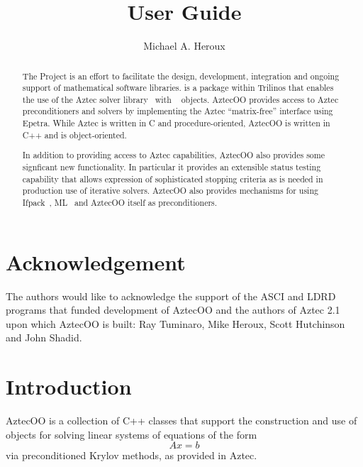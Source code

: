 \documentclass[12pt,relax]{AztecOOUserGuide}
\title{\AztecOOTM{} User Guide}
\author{Michael A. Heroux}
\date{} %
\begin{document}
\maketitle

\begin{abstract}

The \TrilinosTM{} Project is an effort to facilitate the design, development,
integration and ongoing support of mathematical software libraries.
\AztecOOTM{} is a package within Trilinos that enables the use of the Aztec solver 
library~\cite{Aztec2.1} with \EpetraTM{}~\cite{Epetra-home-page} objects.  
AztecOO provides access to Aztec preconditioners and solvers by
implementing the Aztec ``matrix-free'' interface using Epetra.
While Aztec is written in C and procedure-oriented, 
AztecOO is written in C++ and is object-oriented.

In addition to providing access to Aztec capabilities, AztecOO also
provides some signficant new functionality.  In particular it provides
an extensible status testing capability that allows expression of
sophisticated stopping criteria as is needed in production use of
iterative solvers.  AztecOO also provides mechanisms for using 
Ifpack~\cite{Ifpack-home-page}, ML~\cite{ML-home-page} and AztecOO
itself as preconditioners.
\end{abstract}


\section*{Acknowledgement}
The authors would like to acknowledge the support of the ASCI and LDRD 
programs that funded development of AztecOO and the authors of Aztec
2.1 upon which AztecOO is built: Ray Tuminaro, Mike Heroux, Scott
Hutchinson and John Shadid.  

\clearpage
\tableofcontents
\listoffigures

\clearpage

\section{Introduction}
\label{Section:Introduction}

AztecOO is a collection of C++ classes that support the construction
and use of objects for solving linear systems of equations of the form
\begin{equation}
\label{e:axb}
Ax = b
\end{equation}
via
preconditioned Krylov methods, as provided in Aztec.
\end{document}
